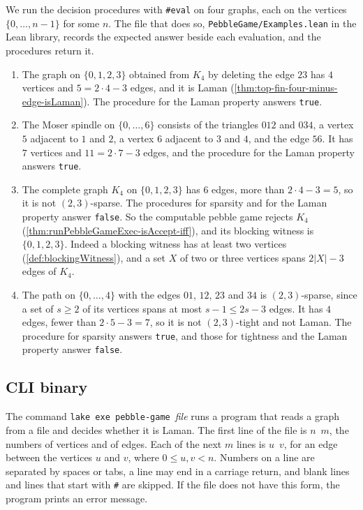 We run the decision procedures with \texttt{\#eval} on four graphs,
each on the vertices $\{0, \ldots, n - 1\}$ for some $n$. The file that
does so, \texttt{PebbleGame/Examples.lean} in the Lean library, records
the expected answer beside each evaluation, and the procedures return
it.
\begin{enumerate}
  \item The graph on $\{0, 1, 2, 3\}$ obtained from $K_4$ by deleting
    the edge $23$ has $4$ vertices and $5 = 2 \cdot 4 - 3$ edges, and it
    is Laman (\cref{thm:top-fin-four-minus-edge-isLaman}). The procedure
    for the Laman property answers \texttt{true}.
  \item The Moser spindle on $\{0, \ldots, 6\}$ consists of the
    triangles $012$ and $034$, a vertex $5$ adjacent to $1$ and $2$, a
    vertex $6$ adjacent to $3$ and $4$, and the edge $56$. It has $7$
    vertices and $11 = 2 \cdot 7 - 3$ edges, and the procedure for the
    Laman property answers \texttt{true}.
  \item The complete graph $K_4$ on $\{0, 1, 2, 3\}$ has $6$ edges, more
    than $2 \cdot 4 - 3 = 5$, so it is not $(2, 3)$-sparse. The
    procedures for sparsity and for the Laman property answer
    \texttt{false}. So the computable pebble game rejects $K_4$
    (\cref{thm:runPebbleGameExec-isAccept-iff}), and its blocking witness
    is $\{0, 1, 2, 3\}$. Indeed a blocking witness has at least two
    vertices (\cref{def:blockingWitness}), and a set $X$ of two or three
    vertices spans $2|X| - 3$ edges of $K_4$.
  \item The path on $\{0, \ldots, 4\}$ with the edges $01$, $12$, $23$
    and $34$ is $(2, 3)$-sparse, since a set of $s \ge 2$ of its
    vertices spans at most $s - 1 \le 2s - 3$ edges. It
    has $4$ edges, fewer than $2 \cdot 5 - 3 = 7$, so it is not
    $(2, 3)$-tight and not Laman. The procedure for sparsity answers
    \texttt{true}, and those for tightness and the Laman property answer
    \texttt{false}.
\end{enumerate}

\subsection{CLI binary}
\label{sec:executable-cli}

The command \texttt{lake exe pebble-game}~\emph{file} runs a program that
reads a graph from a file and decides whether it is Laman. The first
line of the file is $n$~$m$, the numbers of vertices and of edges. Each
of the next $m$ lines is $u$~$v$, for an edge between the vertices $u$
and $v$, where $0 \le u, v < n$. Numbers on a line are separated by
spaces or tabs, a line may end in a carriage return, and blank lines and
lines that start with \texttt{\#} are skipped. If the file does not
have this form, the program prints an error message.

